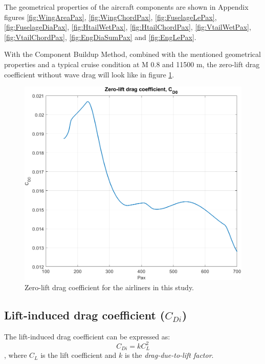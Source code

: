 \documentclass[english]{kththesis}
\begin{document}
The geometrical properties of the aircraft components are shown in Appendix figures \ref{fig:WingAreaPax}, \ref{fig:WingChordPax}, \ref{fig:FuselageLePax}, \ref{fig:FuselageDiaPax}, \ref{fig:HtailWetPax}, \ref{fig:HtailChordPax}, \ref{fig:VtailWetPax}, \ref{fig:VtailChordPax}, \ref{fig:EngDiaSumPax} and \ref{fig:EngLePax}.

With the Component Buildup Method, combined with the mentioned geometrical properties and a typical cruise condition at M 0.8 and 11500 m, the zero-lift drag coefficient without wave drag will look like in figure \ref{fig:CD0Pax}.

\begin{figure}[!ht]
    \centering
    \includegraphics[width=1\textwidth]{Epictures/Zero-liftDragPax.png}
    \caption{Zero-lift drag coefficient for the airliners in this study.}
    \label{fig:CD0Pax}
\end{figure}


\subsection{Lift-induced drag coefficient ($C_{Di}$)}
\label{sec:k}

The lift-induced drag coefficient can be expressed as:
\begin{equation}
\label{eq:CDi}
C_{Di} = k C_L^2
\end{equation}
, where $C_L$ is the lift coefficient and $k$ is the \textit{drag-due-to-lift factor}.
\end{document}
